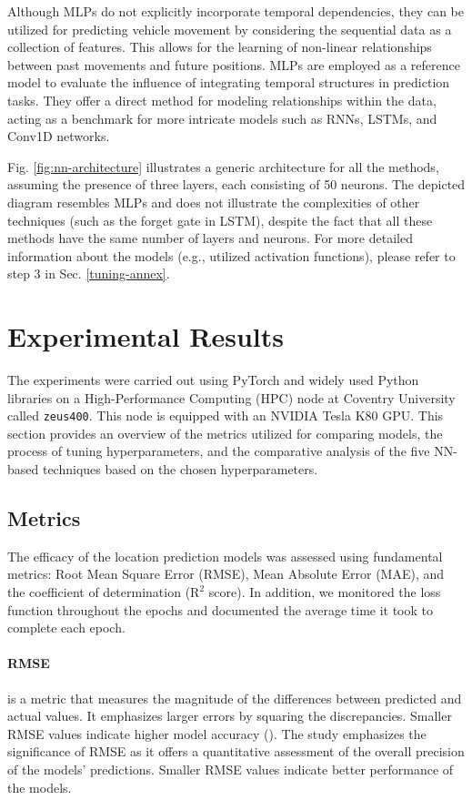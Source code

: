 \documentclass[journal,onecolumn]{IEEEtran}
\begin{document}
{Although MLPs do not explicitly incorporate temporal dependencies, they can be utilized for predicting vehicle movement by considering the sequential data as a collection of features. This allows for the learning of non-linear relationships between past movements and future positions. MLPs are employed as a reference model to evaluate the influence of integrating temporal structures in prediction tasks. They offer a direct method for modeling relationships within the data, acting as a benchmark for more intricate models such as RNNs, LSTMs, and Conv1D networks.

Fig. \ref{fig:nn-architecture} illustrates a generic architecture for all the methods, assuming the presence of three layers, each consisting of 50 neurons. The depicted diagram resembles MLPs and does not illustrate the complexities of other techniques (such as the forget gate in LSTM), despite the fact that all these methods have the same number of layers and neurons. For more detailed information about the models (e.g., utilized activation functions), please refer to step 3 in Sec. \ref{tuning-annex}.

\section{Experimental Results} \label{results}
The experiments were carried out using PyTorch and widely used Python libraries on a High-Performance Computing (HPC) node at Coventry University called \texttt{zeus400}. This node is equipped with an NVIDIA Tesla K80 GPU. This section provides an overview of the metrics utilized for comparing models, the process of tuning hyperparameters, and the comparative analysis of the five NN-based techniques based on the chosen hyperparameters.

\subsection{Metrics}
The efficacy of the location prediction models was assessed using fundamental metrics: Root Mean Square Error (RMSE), Mean Absolute Error (MAE), and the coefficient of determination ($\text{R}^2$ score). In addition, we monitored the loss function throughout the epochs and documented the average time it took to complete each epoch.

\paragraph{RMSE}
is a metric that measures the magnitude of the differences between predicted and actual values. It emphasizes larger errors by squaring the discrepancies. Smaller RMSE values indicate higher model accuracy (\cite{cr05willmott}). The study emphasizes the significance of RMSE as it offers a quantitative assessment of the overall precision of the models' predictions. Smaller RMSE values indicate better performance of the models.

}
\end{document}
